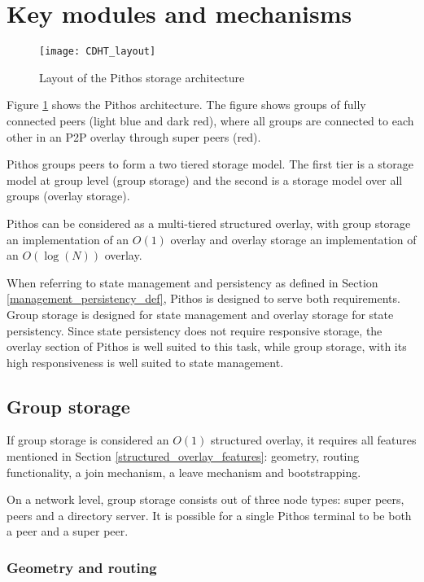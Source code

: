 \section{Key modules and mechanisms}
\label{key_modules_mechs}

\begin{figure}[htbp]
 \centering
 \texttt{[image: CDHT\_layout]}
 \caption{Layout of the Pithos storage architecture}
 \label{fig_pithos}
\end{figure}
%
Figure \ref{fig_pithos} shows the Pithos architecture. The figure shows groups of fully connected peers (light blue and dark red), where all groups are connected to each other in an P2P overlay through super peers (red).

Pithos groups peers to form a two tiered storage model. The first tier is a storage model at group level (group storage) and the second is a storage model over all groups (overlay storage).

Pithos can be considered as a multi-tiered structured overlay, with group storage an implementation of an $O(1)$ overlay and overlay storage an implementation of an $O(\log (N))$ overlay.

When referring to state management and persistency as defined in Section \ref{management_persistency_def}, Pithos is designed to serve both requirements. Group storage is designed for state management and overlay storage for state persistency. Since state persistency does not require responsive storage, the overlay section of Pithos is well suited to this task, while group storage, with its high responsiveness is well suited to state management.

\subsection{Group storage}

If group storage is considered an $O(1)$ structured overlay, it requires all features mentioned in Section \ref{structured_overlay_features}: geometry, routing functionality, a join mechanism, a leave mechanism and bootstrapping.

On a network level, group storage consists out of three node types: super peers, peers and a directory server. It is possible for a single Pithos terminal to be both a peer and a super peer.

\subsubsection{Geometry and routing}

